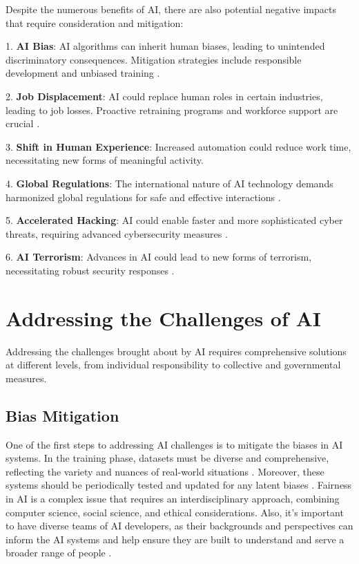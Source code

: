 \documentclass[man]{apa7}
\begin{document}
Despite the numerous benefits of AI, there are also potential negative impacts that require consideration and mitigation:

1. \textbf{AI Bias}: AI algorithms can inherit human biases, leading to unintended discriminatory consequences. Mitigation strategies include responsible development and unbiased training \parencite{buolamwini2018}.

2. \textbf{Job Displacement}: AI could replace human roles in certain industries, leading to job losses. Proactive retraining programs and workforce support are crucial \parencite{arntz2016}.

3. \textbf{Shift in Human Experience}: Increased automation could reduce work time, necessitating new forms of meaningful activity.

4. \textbf{Global Regulations}: The international nature of AI technology demands harmonized global regulations for safe and effective interactions \parencite{schneider2020}.

5. \textbf{Accelerated Hacking}: AI could enable faster and more sophisticated cyber threats, requiring advanced cybersecurity measures \parencite{brundage2020}.

6. \textbf{AI Terrorism}: Advances in AI could lead to new forms of terrorism, necessitating robust security responses \parencite{brundage2020}.

\section{Addressing the Challenges of AI}

Addressing the challenges brought about by AI requires comprehensive solutions at different levels, from individual responsibility to collective and governmental measures.

\subsection{Bias Mitigation}
One of the first steps to addressing AI challenges is to mitigate the biases in AI systems. In the training phase, datasets must be diverse and comprehensive, reflecting the variety and nuances of real-world situations \parencite{gebru2018}. Moreover, these systems should be periodically tested and updated for any latent biases \parencite{mitchell2019}. Fairness in AI is a complex issue that requires an interdisciplinary approach, combining computer science, social science, and ethical considerations. Also, it's important to have diverse teams of AI developers, as their backgrounds and perspectives can inform the AI systems and help ensure they are built to understand and serve a broader range of people \parencite{holstein2019}.
\end{document}
